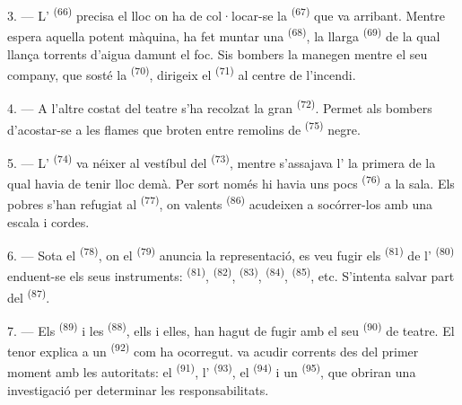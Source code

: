 3. --- L' \textsuperscript{(66)} precisa el lloc on ha de
col·locar-se la  \textsuperscript{(67)} que va arribant.
Mentre espera aquella potent màquina, ha fet muntar una 
\textsuperscript{(68)}, la llarga  \textsuperscript{(69)} de la qual
llança torrents d'aigua damunt el foc. Sis bombers la manegen mentre el seu
company, que sosté la  \textsuperscript{(70)}, dirigeix el
 \textsuperscript{(71)} al centre de l'incendi.

4. --- A l'altre costat del teatre s'ha recolzat la gran 
\textsuperscript{(72)}. Permet als bombers d'acostar-se a les flames que broten
entre remolins de  \textsuperscript{(75)} negre.

\VUsaut{5.0mm}
\VUsaut{3.4mm}

5. --- L' \textsuperscript{(74)} va néixer al vestíbul del
 \textsuperscript{(73)}, mentre s'assajava l' la
primera  de la qual havia de tenir lloc demà. Per sort
només hi havia uns pocs  \textsuperscript{(76)} a la sala. Els
pobres s'han refugiat al  \textsuperscript{(77)}, on valents
 \textsuperscript{(86)} acudeixen a socórrer-los amb una escala i
cordes.

6. --- Sota el  \textsuperscript{(78)}, on el 
\textsuperscript{(79)} anuncia la representació, es veu fugir els 
\textsuperscript{(81)} de l' \textsuperscript{(80)} enduent-se
els seus instruments:  \textsuperscript{(81)}, 
\textsuperscript{(82)},  \textsuperscript{(83)},
 \textsuperscript{(84)}, 
\textsuperscript{(85)}, etc. S'intenta salvar part del 
\textsuperscript{(87)}.

7. --- Els  \textsuperscript{(89)} i les 
\textsuperscript{(88)},  ells i elles, han hagut de fugir amb el
seu  \textsuperscript{(90)} de teatre. El tenor explica a un
 \textsuperscript{(92)} com ha ocorregut. 
va acudir corrents des del primer moment amb les autoritats: el
 \textsuperscript{(91)}, l'
\textsuperscript{(93)}, el  \textsuperscript{(94)} i
un  \textsuperscript{(95)}, que obriran una investigació per
determinar les responsabilitats.
\VUsaut{6.0mm}
\VUfilet{22mm}
